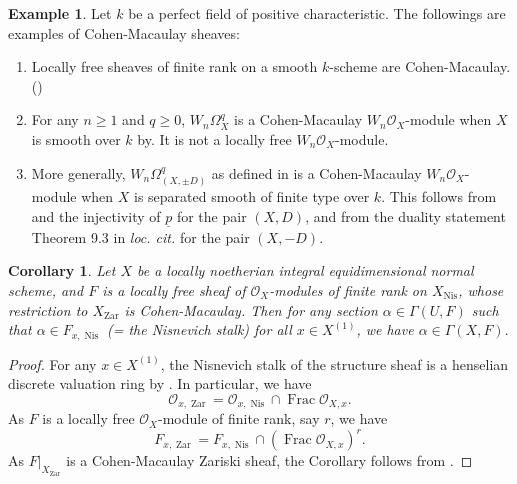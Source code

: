 \documentclass[11pt]{amsart}
\newcommand{\cO}{\mathcal{O}}
\newcommand{\Frac}{\operatorname{Frac}}
\newcommand{\Zar}{{\operatorname{Zar}}}
\newcommand{\Nis}{{\operatorname{Nis}}}
\newcommand{\ul}{\underline}
\theoremstyle{plain}
\newtheorem{cor}[prop]{Corollary}
\theoremstyle{definition}
\newtheorem{example}[prop]{Example}
\numberwithin{equation}{prop}
\begin{document}
\begin{example}
\label{lemAppHartog:Ex}
Let $k$ be a perfect field of positive characteristic. The followings are examples of Cohen-Macaulay sheaves:
\begin{enumerate}
\item 
\label{lemAppHartog:Ex1}
Locally free sheaves of finite rank on a smooth $k$-scheme are Cohen-Macaulay. (\cite[p.239, Example]{Ha66})
\item 
\label{lemAppHartog:Ex2}
For any $n\ge 1$ and $q\ge 0$, $W_n\Omega^q_X$ is a Cohen-Macaulay $W_n\cO_X$-module when $X$ is smooth over $k$ by\cite[I. Corollaire 3.9]{IlDRW}. It is not a locally free $W_n\cO_X$-module.
\item 
\label{lemAppHartog:Ex3}
More generally, $W_n\Omega^q_{(X,\pm D)}$ as defined in \cite{RamFil1} is a Cohen-Macaulay $W_n\cO_X$-module when $X$ is separated smooth of finite type over $k$.  
This follows from \cite[Theorem 6.4]{RamFil1} and the injectivity of $\ul p$ for the pair $(X,D)$, and from the duality statement Theorem 9.3 in \textit{loc. cit.} for the pair $(X,-D)$.
\end{enumerate}
\end{example}

\begin{cor}\label{lemAppHartogNis}
Let $X$ be a locally noetherian integral equidimensional normal scheme, and $F$ is a locally free sheaf of $\cO_X$-modules of finite rank on $X_\Nis$, whose restriction to $X_\Zar$ is Cohen-Macaulay.
Then for any section $\alpha\in \Gamma(U,F)$ such that $\alpha\in F_{x,\Nis}$ (= the Nisnevich stalk) for all $x\in X^{(1)}$, we have $\alpha\in \Gamma(X,F).$
\end{cor}
\begin{proof}
For any $x\in X^{(1)}$, the Nisnevich stalk of the structure sheaf is a henselian discrete valuation ring by \cite[\href{https://stacks.math.columbia.edu/tag/0AP3}{Tag 0AP3}]{stacks-project}.
In particular, we have
$$\cO_{x,\Zar}=\cO_{x,\Nis}\cap \Frac \cO_{X,x}.$$
As $F$ is a locally free $\cO_X$-module of finite rank, say $r$, we have
$$F_{x,\Zar}=F_{x,\Nis}\cap (\Frac \cO_{X,x})^r.$$
As $F|_{X_\Zar}$ is a Cohen-Macaulay Zariski sheaf,  the Corollary follows from .
\end{proof}
\end{document}

